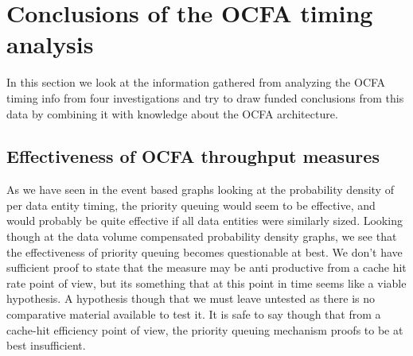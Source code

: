 \section{Conclusions of the OCFA timing analysis}
In this section we look at the information gathered from analyzing the OCFA timing info from four investigations and try to draw funded conclusions from this data by combining it with knowledge about the OCFA architecture.
\subsection{Effectiveness of OCFA throughput measures}
As we have seen in the event based graphs looking at the probability density of per data entity timing, the priority queuing would seem to be effective, and would probably be quite effective if all data entities were similarly sized. Looking though at the data volume compensated probability density graphs, we see that the effectiveness of priority queuing becomes questionable at best. We don't have sufficient proof to state that the measure may be anti productive from a cache hit rate point of view, but its something that at this point in time seems like a viable hypothesis. A hypothesis though that we must leave untested as there is no comparative material available to test it. It is safe to say though that from a cache-hit efficiency point of view, the priority queuing mechanism proofs to be at best insufficient.
